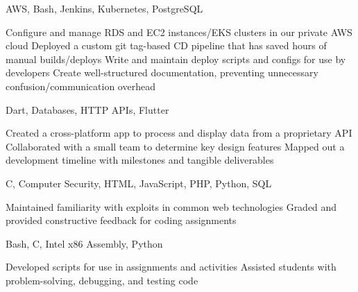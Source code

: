\documentclass[12pt,letterpaper]{article}
\begin{document}
\begin{experiencesection}
    {AWS, Bash, Jenkins, Kubernetes, PostgreSQL}{
        \begin{details}
            \detail Configure and manage RDS and EC2 instances/EKS clusters in our private AWS cloud
            \detail Deployed a custom git tag-based CD pipeline that has saved hours of manual builds/deploys
            \detail Write and maintain deploy scripts and configs for use by developers
            \detail Create well-structured documentation, preventing unnecessary confusion/communication overhead
        \end{details}
    }
    {Dart, Databases, HTTP APIs, Flutter}{
        \begin{details}
            \detail Created a cross-platform app to process and display data from a proprietary API
            \detail Collaborated with a small team to determine key design features
            \detail Mapped out a development timeline with milestones and tangible deliverables
        \end{details}
    }
    {C, Computer Security, HTML, JavaScript, PHP, Python, SQL}{
        \begin{details}
            \detail Maintained familiarity with exploits in common web technologies
            \detail Graded and provided constructive feedback for coding assignments
        \end{details}
    }
    {Bash, C, Intel x86 Assembly, Python}{
        \begin{details}
            \detail Developed scripts for use in assignments and activities
            \detail Assisted students with problem-solving, debugging, and testing code
        \end{details}
    }
\end{experiencesection}
\end{document}
